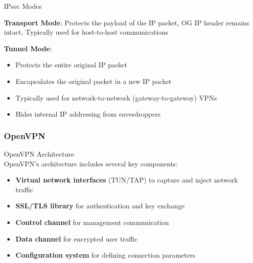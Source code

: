 \begin{concept}{IPsec Modes}

    \textbf{Transport Mode}:
    Protects the payload of the IP packet, OG IP header remains intact, Typically used for host-to-host communications


    \textbf{Tunnel Mode}:
    \begin{itemize}
        \item Protects the entire original IP packet
        \item Encapsulates the original packet in a new IP packet
        \item Typically used for network-to-network (gateway-to-gateway) VPNs
        \item Hides internal IP addressing from eavesdroppers
    \end{itemize}
\end{concept}




\subsubsection{OpenVPN}

\begin{concept}{OpenVPN Architecture}\\
OpenVPN's architecture includes several key components:
\begin{itemize}
    \item \textbf{Virtual network interfaces} (TUN/TAP) to capture and inject network traffic
    \item \textbf{SSL/TLS library} for authentication and key exchange
    \item \textbf{Control channel} for management communication
    \item \textbf{Data channel} for encrypted user traffic
    \item \textbf{Configuration system} for defining connection parameters
\end{itemize}
\end{concept}

